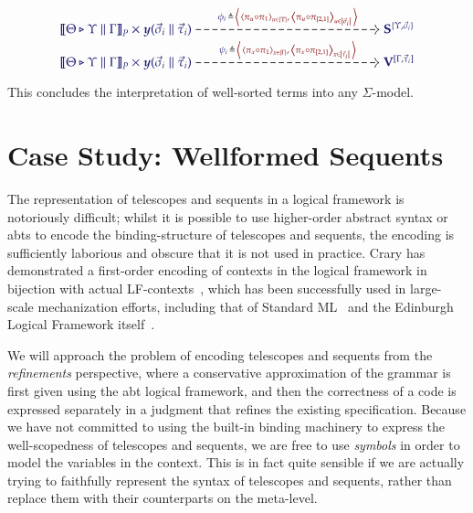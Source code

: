 \documentclass[11pt]{article}
\theoremstyle{definition}
\theoremstyle{remark}
\numberwithin{equation}{section}
\begin{document}
\begin{gather*}
  \begin{tikzcd}[cramped, ampersand replacement = \&]
    {\IMode{
      {\SemBrackets{\Theta\triangleright\Upsilon\parallel\Gamma}}_{P}
      \times
      \Yoneda{\vec{\sigma}_i\parallel\vec{\tau}_i}
    }}
      \arrow[
        , r
        , dashed
        , "
          \Define
            {
              \phi_i\,
            }
            {
              \,\Pair{
                \Tuple{\pi_u\circ\pi_1}_{u\in\Dom{\Upsilon}}
              }{
                \,\Tuple{\pi_u\circ\pi_{[2,1]}}_{u\in\Dom{\vec{\sigma}_i}}
              }
            }
          "
      ]
\&[12.0em]
    {\IMode{\SymPsh^{\{\Upsilon,\vec{\sigma}_i\}}}}
\\[-1.0em]
    {\IMode{
      {\SemBrackets{
        \Theta\triangleright\Upsilon\parallel\Gamma
      }}_{P}
      \times
      \Yoneda{\vec{\sigma}_i\parallel\vec{\tau}_i}
    }}
      \arrow[
        , r
        , dashed
        , "
          \Define{
            \psi_i\,
          }{
            \,\Pair{
              \Tuple{\pi_x\circ\pi_1}_{x\in\Dom{\Gamma}}
            }{
              \,\Tuple{\pi_x\circ\pi_{[2,1]}}_{x\in\Dom{\vec{\tau}_i}}
            }
          }
          "
      ]
\&[12.0em]
    {\IMode{\VarPsh^{[\Gamma,\vec{\tau}_i]}}}
  \end{tikzcd}
\end{gather*}

This concludes the interpretation of well-sorted terms into any $\Sigma$-model.

\section{Case Study: Wellformed Sequents}

The representation of telescopes and sequents in a logical framework is
notoriously difficult; whilst it is possible to use higher-order abstract
syntax or abts to encode the binding-structure of telescopes and sequents, the
encoding is sufficiently laborious and obscure that it is not used in practice.
Crary has demonstrated a first-order encoding of contexts in the logical
framework in bijection with actual LF-contexts~\cite{crary:2009}, which has
been successfully used in large-scale mechanization efforts, including that of
Standard ML~\cite{lee-crary-harper:2007} and the Edinburgh Logical Framework
itself~\cite{martens-crary:2012}.

We will approach the problem of encoding telescopes and sequents from the
\emph{refinements} perspective, where a conservative approximation of the
grammar is first given using the abt logical framework, and then the
correctness of a code is expressed separately in a judgment that refines the
existing specification.  Because we have not committed to using the built-in
binding machinery to express the well-scopedness of telescopes and sequents, we
are free to use \emph{symbols} in order to model the variables in the context.
This is in fact quite sensible if we are actually trying to faithfully
represent the syntax of telescopes and sequents, rather than replace them with
their counterparts on the meta-level.
\end{document}
